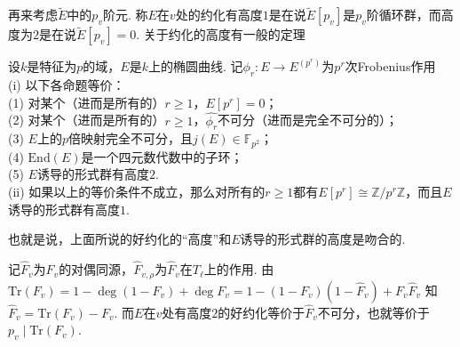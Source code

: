 再来考虑$\tilde{E}$中的$p_v$阶元.
称$E$在$v$处的约化有高度$1$是在说$\tilde{E}[p_v]$是$p_v$阶循环群，而高度为$2$是在说$\tilde{E}[p_v] = 0$.
关于约化的高度有一般的定理
\begin{cthm}
    设$k$是特征为$p$的域，$E$是$k$上的椭圆曲线. 记$\phi_r: E\to E^{(p^r)}$为$p^r$次Frobenius作用\\
    (i) 以下各命题等价：\\
    \quad (1) 对某个（进而是所有的）$r\geq 1$，$E[p^r] = 0$；\\
    \quad (2) 对某个（进而是所有的）$r\geq 1$，$\hat{\phi_r}$不可分（进而是完全不可分的）；\\
    \quad (3) $E$上的$p$倍映射完全不可分，且$j(E)\in \mathbb{F}_{p^2}$；\\
    \quad (4) $\mathrm{End}(E)$是一个四元数代数中的子环；\\
    \quad (5) $E$诱导的形式群有高度$2$.\\
    (ii) 如果以上的等价条件不成立，那么对所有的$r\geq 1$都有$E[p^r] \cong \mathbb{Z}/p^r\mathbb{Z}$，而且$E$诱导的形式群有高度$1$.
\end{cthm}
也就是说，上面所说的好约化的“高度”和$E$诱导的形式群的高度是吻合的.

记$\hat{F}_v$为$F_v$的对偶同源，$\hat{F}_{v,\rho}$为$\hat{F}_v$在$T_{\ell}$上的作用.
由$\mathrm{Tr}(F_v) = 1 - \deg(1-F_v)+\deg F_v = 1 - (1 - F_v)(1-\hat{F}_v) + F_v\hat{F}_v$
知$\hat{F}_v = \mathrm{Tr}(F_v) - F_v$.
而$E$在$v$处有高度$2$的好约化等价于$\hat{F}_v$不可分，也就等价于$p_v \mid \mathrm{Tr}(F_v)$.




